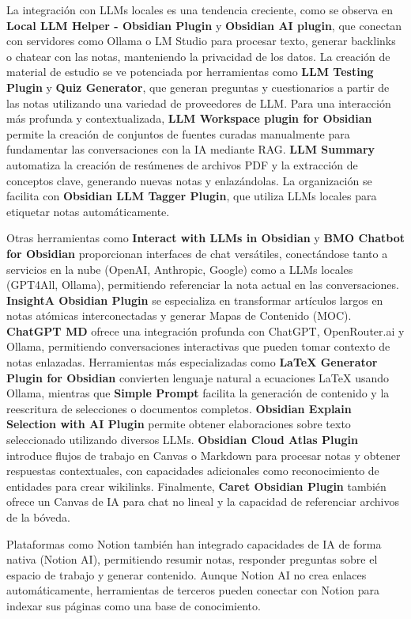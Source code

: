 La integración con LLMs locales es una tendencia creciente, como se observa en \textbf{Local LLM Helper - Obsidian Plugin} y \textbf{Obsidian AI plugin}, que conectan con servidores como Ollama o LM Studio para procesar texto, generar backlinks o chatear con las notas, manteniendo la privacidad de los datos. La creación de material de estudio se ve potenciada por herramientas como \textbf{LLM Testing Plugin} y \textbf{Quiz Generator}, que generan preguntas y cuestionarios a partir de las notas utilizando una variedad de proveedores de LLM. Para una interacción más profunda y contextualizada, \textbf{LLM Workspace plugin for Obsidian} permite la creación de conjuntos de fuentes curadas manualmente para fundamentar las conversaciones con la IA mediante RAG. \textbf{LLM Summary} automatiza la creación de resúmenes de archivos PDF y la extracción de conceptos clave, generando nuevas notas y enlazándolas. La organización se facilita con \textbf{Obsidian LLM Tagger Plugin}, que utiliza LLMs locales para etiquetar notas automáticamente.

Otras herramientas como \textbf{Interact with LLMs in Obsidian} y \textbf{BMO Chatbot for Obsidian} proporcionan interfaces de chat versátiles, conectándose tanto a servicios en la nube (OpenAI, Anthropic, Google) como a LLMs locales (GPT4All, Ollama), permitiendo referenciar la nota actual en las conversaciones. \textbf{InsightA Obsidian Plugin} se especializa en transformar artículos largos en notas atómicas interconectadas y generar Mapas de Contenido (MOC). \textbf{ChatGPT MD} ofrece una integración profunda con ChatGPT, OpenRouter.ai y Ollama, permitiendo conversaciones interactivas que pueden tomar contexto de notas enlazadas. Herramientas más especializadas como \textbf{LaTeX Generator Plugin for Obsidian} convierten lenguaje natural a ecuaciones LaTeX usando Ollama, mientras que \textbf{Simple Prompt} facilita la generación de contenido y la reescritura de selecciones o documentos completos. \textbf{Obsidian Explain Selection with AI Plugin} permite obtener elaboraciones sobre texto seleccionado utilizando diversos LLMs. \textbf{Obsidian Cloud Atlas Plugin} introduce flujos de trabajo en Canvas o Markdown para procesar notas y obtener respuestas contextuales, con capacidades adicionales como reconocimiento de entidades para crear wikilinks. Finalmente, \textbf{Caret Obsidian Plugin} también ofrece un Canvas de IA para chat no lineal y la capacidad de referenciar archivos de la bóveda.

Plataformas como Notion también han integrado capacidades de IA de forma nativa (Notion AI), permitiendo resumir notas, responder preguntas sobre el espacio de trabajo y generar contenido. Aunque Notion AI no crea enlaces automáticamente, herramientas de terceros pueden conectar con Notion para indexar sus páginas como una base de conocimiento.

